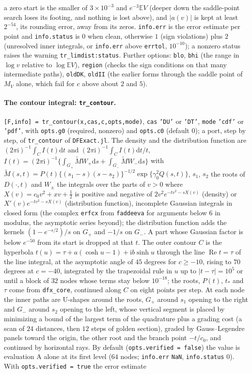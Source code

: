 \documentclass[11pt]{article}
\newcommand{\code}[1]{\texttt{#1}}
\newcommand{\E}{{\mathbb E}}
\newcommand{\iu}{{\mathrm i}}
\newcommand{\dr}[1]{{\mathrm d}#1}
\newcommand{\Rea}{\operatorname{Re}}
\begin{document}
a zero start is the smaller of $3\times10^{-3}$ and $e^{-3}\E V$ (deeper down the saddle-point search loses its footing, and nothing is lost above), and $|a(v)|$ is kept at least $2^{-54}$, its rounding error, away from its zeros.  \code{info.err} is the error estimate per point and \code{info.status} is $0$ when clean, otherwise $1$ (sign violations) plus $2$ (unresolved inner integrals, or \code{info.err} above \code{errtol}, $10^{-10}$); a nonzero status raises the warning \code{tr\_limdist:status}.  Further options: \code{blo}, \code{bhi} (the range in $\log v$ relative to $\log\E V$), \code{region} (checks the sign conditions on that many intermediate paths), \code{oldDK}, \code{oldII} (the earlier forms through the saddle point of $M_V$ alone, which fail for $c$ above about $2$ and $5$).

\paragraph{The contour integral: \code{tr\_contour}.}  \code{[F,info] = tr\_contour(x,cas,c,opts,mode)}, \code{cas} \code{'DU'} or \code{'DT'}, \code{mode} \code{'cdf'} or \code{'pdf'}, with \code{opts.g0} (required, nonzero) and \code{opts.c0} (default $0$); a port, step by step, of \code{tr\_contour} of \code{DFExact.jl}.  The density and the distribution function are $(2\pi\iu)^{-1}\int_C I(t)\dr t$ and $(2\pi\iu)^{-1}\int_C I(t)\dr t/t$, $I(t)=(2\pi\iu)^{-1}\{\int_{G_+}\tilde M W_+\dr s+\int_{G_-}\tilde M W_-\dr s\}$ with $\tilde M(s,t)=P(t)\{(s_1-s)(s-s_2)\}^{-1/2}\exp\{\gamma_0^2Q(s,t)\}$, $s_1$, $s_2$ the roots of $D(\cdot,t)$ and $W_\pm$ the integrals over the parts of $v>0$ where $X(v)=c_0v^2+xv+\frac12$ is positive and negative of $2v^2e^{-tv^2-sX(v)}$ (density) or $X'(v)e^{-tv^2-sX(v)}$ (distribution function), incomplete Gaussian integrals in closed form (the complex \code{erfcx} from \code{faddeeva} for arguments below $6$ in modulus, the asymptotic series beyond); the distribution function adds the kernels $(1-e^{-s/2})/s$ on $G_+$ and $-1/s$ on $G_-$.  A part whose Gaussian factor is below $e^{-50}$ from its start is dropped at that $t$.  The outer contour $C$ is the hyperbola $t(u)=\tau+a(\cosh u-1)+\iu b\sinh u$ through the line $\Rea t=\tau$ of the line integral, at the asymptotic angle of $45$ degrees for $c\ge-10$, rising to $70$ degrees at $c=-40$, integrated by the trapezoidal rule in $u$ up to $|t-\tau|=10^5$ or until a block of $32$ nodes whose terms stay below $10^{-18}$; the roots, $P(t)$, $t_*$ and $\tau$ come from \code{dfx\_core}, continued along $C$ on eight points per step.  At each node the inner paths are U-shapes around the roots, $G_+$ around $s_1$ opening to the right and $G_-$ around $s_2$ opening to the left, whose vertical segment is placed by minimizing a bound of the largest term of the quadrature plus a grading cost (a scan of $24$ distances, then $12$ steps of golden section), graded by Gauss--Legendre panels toward the origin, the other root and the branch point $-t/c_0$, and continued by horizontal rays.  By default (\code{opts.verified = false}) the value is evaluation A alone at its first level ($64$ nodes; \code{info.err} \code{NaN}, \code{info.status} $0$).  With \code{opts.verified = true} the error estimate 
\end{document}
